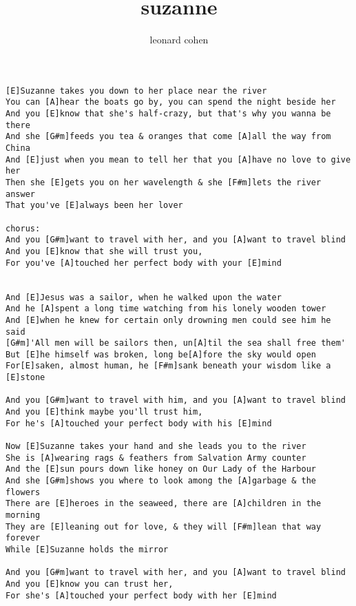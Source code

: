 \author{leonard cohen}
\title{suzanne}
\maketitle
\begin{verbatim}
[E]Suzanne takes you down to her place near the river
You can [A]hear the boats go by, you can spend the night beside her
And you [E]know that she's half-crazy, but that's why you wanna be there
And she [G#m]feeds you tea & oranges that come [A]all the way from China
And [E]just when you mean to tell her that you [A]have no love to give her
Then she [E]gets you on her wavelength & she [F#m]lets the river answer
That you've [E]always been her lover

chorus:
And you [G#m]want to travel with her, and you [A]want to travel blind
And you [E]know that she will trust you,
For you've [A]touched her perfect body with your [E]mind


And [E]Jesus was a sailor, when he walked upon the water
And he [A]spent a long time watching from his lonely wooden tower
And [E]when he knew for certain only drowning men could see him he said
[G#m]'All men will be sailors then, un[A]til the sea shall free them'
But [E]he himself was broken, long be[A]fore the sky would open
For[E]saken, almost human, he [F#m]sank beneath your wisdom like a [E]stone

And you [G#m]want to travel with him, and you [A]want to travel blind
And you [E]think maybe you'll trust him,
For he's [A]touched your perfect body with his [E]mind

Now [E]Suzanne takes your hand and she leads you to the river
She is [A]wearing rags & feathers from Salvation Army counter
And the [E]sun pours down like honey on Our Lady of the Harbour
And she [G#m]shows you where to look among the [A]garbage & the flowers
There are [E]heroes in the seaweed, there are [A]children in the morning
They are [E]leaning out for love, & they will [F#m]lean that way forever
While [E]Suzanne holds the mirror

And you [G#m]want to travel with her, and you [A]want to travel blind
And you [E]know you can trust her,
For she's [A]touched your perfect body with her [E]mind
\end{verbatim}